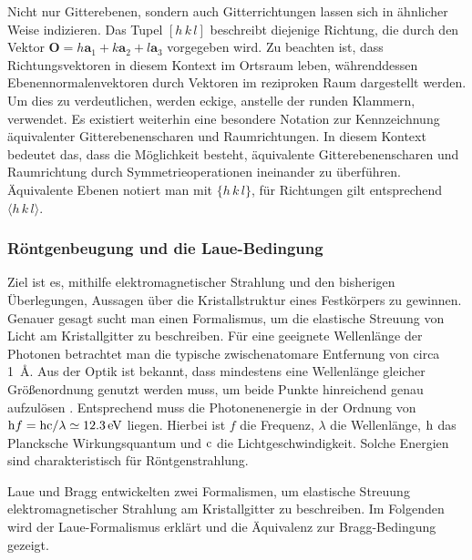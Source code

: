 Nicht nur Gitterebenen, sondern auch Gitterrichtungen lassen sich in ähnlicher Weise indizieren.
Das Tupel $[h\,k\,l]$ beschreibt diejenige Richtung, die durch den Vektor $\mathbf{O} = h\mathbf{a}_{1}+k\mathbf{a}_{2}+
l\mathbf{a}_{3}$ vorgegeben wird.
Zu beachten ist, dass Richtungsvektoren in diesem Kontext im Ortsraum leben,
währenddessen Ebenennormalenvektoren durch Vektoren im reziproken Raum dargestellt werden.
Um dies zu verdeutlichen, werden eckige, anstelle der runden Klammern, verwendet.
Es existiert weiterhin eine besondere Notation zur Kennzeichnung äquivalenter Gitterebenenscharen und Raumrichtungen.
In diesem Kontext bedeutet das, dass die Möglichkeit besteht, äquivalente Gitterebenenscharen und Raumrichtung durch
Symmetrieoperationen ineinander zu überführen.
Äquivalente Ebenen notiert man mit $\{h \,k\, l \}$, für Richtungen gilt entsprechend $\langle h\, k \, l \rangle$.

\subsubsection{Röntgenbeugung und die Laue-Bedingung}
Ziel ist es, mithilfe elektromagnetischer Strahlung und den bisherigen Überlegungen, Aussagen über die
Kristallstruktur eines Festkörpers zu gewinnen.
Genauer gesagt sucht man einen Formalismus, um die elastische Streuung von Licht am Kristallgitter zu beschreiben.
Für eine geeignete Wellenlänge der Photonen betrachtet man die typische zwischenatomare Entfernung von circa
\qty{1}{\angstrom}.
Aus der Optik ist bekannt, dass mindestens eine Wellenlänge gleicher Größenordnung genutzt werden
muss, um beide Punkte hinreichend genau aufzulösen \autocite{Ashcroft}.
Entsprechend muss die Photonenenergie in der Ordnung von
$\mathrm{h} f =\mathrm{h} \mathrm{c} / \lambda \simeq \qty{12.3}{\electronvolt}$ liegen.
Hierbei ist $f$ die Frequenz, $\lambda$ die Wellenlänge, $\mathrm{h}$ das Plancksche Wirkungsquantum und $\mathrm{c}$ die
Lichtgeschwindigkeit.
Solche Energien sind charakteristisch für Röntgenstrahlung.

Laue und Bragg entwickelten zwei Formalismen, um elastische Streuung elektromagnetischer Strahlung am Kristallgitter
zu beschreiben.
Im Folgenden wird der Laue-For\-ma\-lis\-mus erklärt und die Äquivalenz zur Bragg-Bedingung gezeigt.

